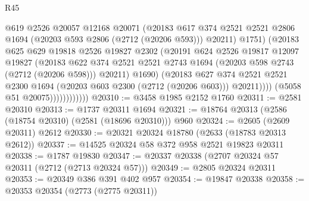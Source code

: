 \begin{lexlean}{R45}
\begin{coremodule}
                                @619
                                @2526
                                @20057
                                @12168
                                @20071
                                (@20183
                                  @617
                                  @374
                                  @2521
                                  @2521
                                  @2806
                                  @1694
                                  (@20203 @593 @2806 (@2712 (@20206 @593)))
                                  @20211)
                                @1751)
                              (@20183
                                @625
                                @629
                                @19818
                                @2526
                                @19827
                                @2302
                                (@20191
                                  @624
                                  @2526
                                  @19817
                                  @12097
                                  @19827
                                  (@20183
                                    @622
                                    @374
                                    @2521
                                    @2521
                                    @2743
                                    @1694
                                    (@20203 @598 @2743 (@2712 (@20206 @598)))
                                    @20211)
                                  @1690)
                                (@20183
                                  @627
                                  @374
                                  @2521
                                  @2521
                                  @2300
                                  @1694
                                  (@20203 @603 @2300 (@2712 (@20206 @603)))
                                  @20211))))
                          (@5058 @51 @20075))))))))))))
@20310 := @3458 @1985 @2152 @1760
@20311 := @2581 @20310
@20313 := @1737 @20311 @1694
@20321 := @18764 @20313 (@2586 (@18754 @20310) (@2581 (@18696 @20310))) @960
@20324 := @2605 (@2609 @20311) @2612
@20330 := @20321 @20324 @18780 (@2633 (@18783 @20313 @2612))
@20337 := @14525 @20324 @58 @372 @958 @2521 @19823 @20311
@20338 := @1787 @19830
@20347 := @20337 @20338 (@2707 @20324 @57 @20311 (@2712 (@2713 @20324 @57)))
@20349 := @2805 @20324 @20311
@20353 := @20349 @386 @391 @402 @957
@20354 := @19847 @20338
@20358 := @20353 @20354 (@2773 (@2775 @20311))

\end{coremodule}
\end{lexlean}
